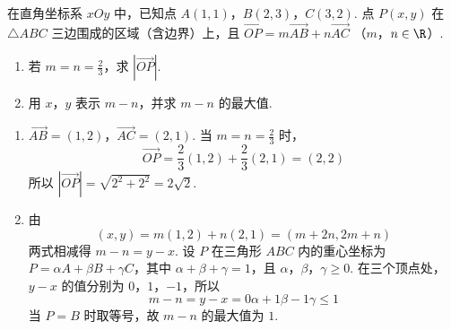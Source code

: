 \begin{problem}
在直角坐标系 \(xOy\) 中，已知点 \(A(1,1)\)，\(B(2,3)\)，\(C(3,2)\). 点 \(P(x,y)\) 在 \(\triangle ABC\) 三边围成的区域（含边界）上，且 \(\overrightarrow{OP} = m\overrightarrow{AB} + n\overrightarrow{AC}\) （\(m\)，\(n \in \R\)）.

\begin{enumerate}
\item 若 \(m = n = \frac{2}{3}\)，求 \(\left|\overrightarrow{OP}\right|\).
\item 用 \(x\)，\(y\) 表示 \(m - n\)，并求 \(m - n\) 的最大值.
\end{enumerate}
\begin{solution}
\begin{enumerate}
\item \(\overrightarrow{AB}=(1,2)\)，\(\overrightarrow{AC}=(2,1)\). 当 \(m=n=\frac23\) 时，
\[
\overrightarrow{OP}=\frac23(1,2)+\frac23(2,1)=(2,2)
\]
所以 \(\left|\overrightarrow{OP}\right|=\sqrt{2^2+2^2}=2\sqrt2\).

\item 由
\[
(x,y)=m(1,2)+n(2,1)=(m+2n,2m+n)
\]
两式相减得 \(m-n=y-x\). 设 \(P\) 在三角形 \(ABC\) 内的重心坐标为 \(P=\alpha A+\beta B+\gamma C\)，其中 \(\alpha+\beta+\gamma=1\)，且 \(\alpha\)，\(\beta\)，\(\gamma\geqslant0\). 在三个顶点处，\(y-x\) 的值分别为 \(0\)，\(1\)，\(-1\)，所以
\[
m-n=y-x=0\alpha+1\beta-1\gamma\leqslant1
\]
当 \(P=B\) 时取等号，故 \(m-n\) 的最大值为 \(1\).
\end{enumerate}
\end{solution}
\end{problem}

